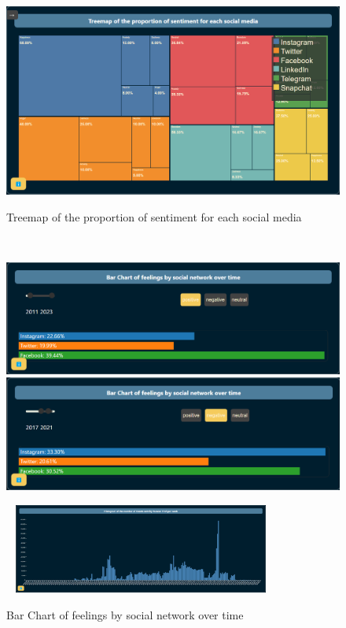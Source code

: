 \documentclass[a4paper,12pt,titlepage,leqno]{article}
\begin{document}
\begin{figure}[h!]
\begin{minipage}{0.48\textwidth}
\includegraphics[width=\textwidth]{ressources/treeMap2.png}
\end{minipage}
\caption{Treemap of the proportion of sentiment for each social media}
\
\begin{minipage}{0.48\textwidth}
\centering
\includegraphics[width=\textwidth]{ressources/barChart1.png}
\end{minipage}
\begin{minipage}{0.48\textwidth}
\centering
\includegraphics[width=\textwidth]{ressources/barChart2.png}
\end{minipage}
\caption{Bar Chart of feelings by social network over time}
\
\centering
\includegraphics[width=0.75\textwidth]{ressources/histogram1.png}

\end{figure}
\end{document}
